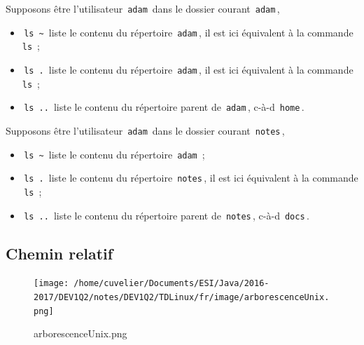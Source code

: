 \documentclass[11pt,a4paper]{article}
\begin{document}
          Supposons \^etre l'utilisateur \,\verb|adam|\, dans le dossier courant \,\verb|adam|\,, 
          
					\begin{itemize}
				
			\item \,\verb|ls ~|\, liste le contenu du r\'epertoire \,\verb|adam|\,, 
			        il est ici \'equivalent \`a la commande \,\verb|ls|\,  ;
            
			\item \,\verb|ls .|\, liste le contenu du r\'epertoire \,\verb|adam|\,, 
			        il est ici \'equivalent \`a la commande \,\verb|ls|\,  ;
            
			\item \,\verb|ls ..|\, liste le contenu du r\'epertoire parent de \,\verb|adam|\,, 
			        c-\`a-d \,\verb|home|\,.
            
					\end{itemize}
				
            \par
        
          Supposons \^etre l'utilisateur \,\verb|adam|\, dans le dossier courant \,\verb|notes|\,, 
          
					\begin{itemize}
				
			\item \,\verb|ls ~|\, liste le contenu du r\'epertoire \,\verb|adam|\, ;
            
			\item \,\verb|ls .|\, liste le contenu du r\'epertoire \,\verb|notes|\,, 
			        il est ici \'equivalent \`a la commande \,\verb|ls|\,  ;
            
			\item \,\verb|ls ..|\, liste le contenu du r\'epertoire parent de \,\verb|notes|\,, 
			        c-\`a-d \,\verb|docs|\,.
            
					\end{itemize}
				
            \par
        \subsection{Chemin relatif}\begin{figure}[hbt]
				    \begin{center}
					\texttt{[image: /home/cuvelier/Documents/ESI/Java/2016-2017/DEV1Q2/notes/DEV1Q2/TDLinux/fr/image/arborescenceUnix.png]}
						\end{center}
                
                    \caption[arborescenceUnix.png]{arborescenceUnix.png}
                \end{figure}
                    
\end{document}

